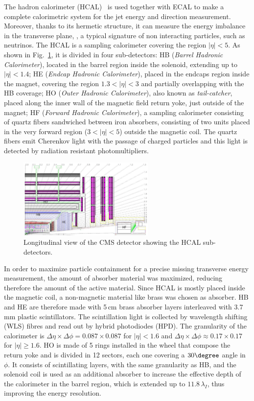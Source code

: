 The hadron calorimeter (HCAL)~\cite{hcal} is used together with ECAL to make a complete calorimetric system for the jet energy and direction measurement. Moreover, thanks to its hermetic structure, it can measure the energy imbalance in the transverse plane, \MET, a typical signature of non interacting particles, such as neutrinos. The HCAL is a sampling calorimeter covering the region $|\eta|<5$. As shown in Fig.~\ref{fig:hcal}, it is divided in four sub-detectors: HB (\emph{Barrel Hadronic Calorimeter}), located in the barrel region inside the solenoid, extending up to $|\eta|<1.4$; HE (\emph{Endcap Hadronic Calorimeter}), placed in the endcaps region inside the magnet, covering the region $1.3 < |\eta| < 3$ and partially overlapping with the HB coverage; HO (\emph{Outer Hadronic Calorimeter}), also known as \emph{tail-catcher}, placed along the inner wall of the magnetic field return yoke, just outside of the magnet; HF (\emph{Forward Hadronic Calorimeter}), a sampling calorimeter consisting of quartz fibers sandwiched between iron absorbers,
consisting of two units placed in the very forward region ($3<|\eta|<5$) outside the magnetic coil. The quartz fibers emit Cherenkov light with the passage of charged particles and this light is detected by radiation resistant photomultipliers.
\begin{figure}[htb]
\centering
\includegraphics[width=0.6\textwidth]{images/hcal.png}
\caption{Longitudinal view of the CMS detector showing the HCAL sub-detectors.}\label{fig:hcal}
\end{figure}
In order to maximize particle containment for a precise missing transverse energy measurement, the amount of absorber material was maximized, reducing therefore the amount of the active material. Since HCAL is mostly placed inside the magnetic coil, a non-magnetic material like brass was chosen as absorber. HB and HE are therefore made with 5\,cm brass absorber layers interleaved with 3.7\,mm plastic scintillators. The scintillation light is collected by wavelength shifting (WLS) fibres and read out by hybrid photodiodes (HPD). The granularity of the calorimeter is $\Delta\eta\times\Delta\phi = 0.087 \times 0.087$ for $|\eta|<1.6$ and $\Delta\eta\times\Delta\phi \approx 0.17 \times 0.17$ for $|\eta|\geq1.6$. HO is made of 5 rings installed in the wheel that compose the return yoke and is divided in 12 sectors, each one covering a $30\degree$ angle in $\phi$. It consists of scintillating layers, with the same granularity as HB, and the solenoid coil is used as an additional absorber to increase the effective depth of the calorimeter in the barrel region, which is extended up to $11.8\,\lambda_I$, thus improving the energy resolution.

